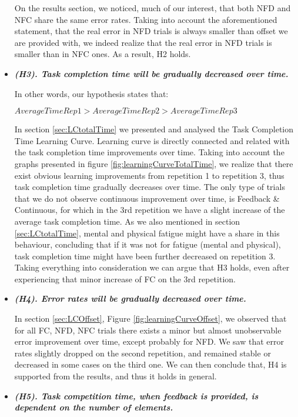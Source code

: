 \begin{itemize}
    On the results section, we noticed, much of our interest, that both NFD and NFC share the same error rates. Taking into account the aforementioned statement, that the real error in NFD trials is always smaller than offset we are provided with, we indeed realize that the real error in NFD trials is smaller than in NFC ones. As a result, H2 holds.

    \item \textbf{\textit{(H3). Task completion time will be gradually decreased over time.}}

    In other words, our hypothesis states that: 

    $AverageTimeRep1 > AverageTimeRep2 > AverageTimeRep3$ 

    In section \ref{sec:LCtotalTime} we presented and analysed the Task Completion Time Learning Curve. Learning curve is directly connected and related with the task completion time improvements over time. Taking into account the graphs presented in figure \ref{fig:learningCurveTotalTime}, we realize that there exist obvious learning improvements from repetition 1 to repetition 3, thus task completion time gradually decreases over time.  The only type of trials that we do not observe continuous improvement over time, is Feedback \& Continuous, for which in the 3rd repetition we have a slight increase of the average task completion time. As we also mentioned in section \ref{sec:LCtotalTime}, mental and physical fatigue might have a share in this behaviour, concluding that if it was not for fatigue (mental and physical), task completion time might have been further decreased on repetition 3. Taking everything into consideration we can argue that H3 holds, even after experiencing that minor increase of FC on the 3rd repetition.

    \item \textbf{\textit{(H4). Error rates will be gradually decreased over time.}}
    
    In section \ref{sec:LCOffset}, Figure \ref{fig:learningCurveOffset}, we observed that for all FC, NFD, NFC trials there exists a minor but almost unobservable error improvement over time, except probably for NFD. We saw that error rates slightly dropped on the second repetition, and remained stable or decreased in some cases on the third one. We can then conclude that, H4 is supported from the results, and thus it holds in general. 


    \item \textbf{\textit{(H5). Task competition time, when feedback is provided, is dependent on the number of elements.}}


\end{itemize}
